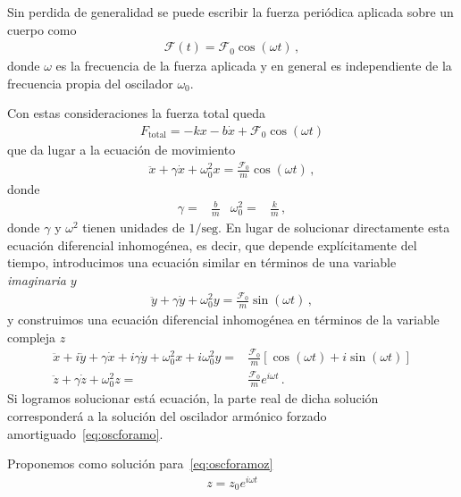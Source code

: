 Sin perdida de generalidad se puede escribir la fuerza periódica aplicada sobre un cuerpo como
\begin{align*}
  \mathcal{F}(t)=\mathcal{F}_0\cos(\omega t)\,,
\end{align*}
donde $\omega$ es la frecuencia de la fuerza aplicada y en general es independiente de la frecuencia propia del oscilador $\omega_0$. 

Con estas consideraciones la fuerza total queda
\begin{align*}
  F_{\text{total}}=-k x -b\dot x+\mathcal{F}_0\cos(\omega t)
\end{align*}
que da lugar a la ecuación de movimiento
\begin{align}
  \label{eq:oscforamo}
  \ddot x+\gamma \dot x+\omega_0^2 x=\frac{\mathcal{F}_0}{m}\cos(\omega t)\,,
\end{align}
donde
\begin{align*}
  \gamma=&\frac{b}{m}&\omega_0^2=&\frac{k}{m}\,,
\end{align*}
donde $\gamma$ y $\omega^2$ tienen unidades de $1/\text{seg}$. En lugar de solucionar directamente esta ecuación diferencial inhomogénea, es decir, que depende explícitamente del tiempo, introducimos una ecuación similar en términos de una variable \emph{imaginaria} $y$
\begin{align*}
    \ddot y+\gamma \dot y+\omega_0^2 y=\frac{\mathcal{F}_0}{m}\sin(\omega t)\,,
\end{align*}
y construimos una ecuación diferencial inhomogénea en términos de la variable compleja $z$
\begin{align}
  \label{eq:oscforamoz}
   \ddot x+i\ddot y+\gamma \dot x+i\gamma \dot y+\omega_0^2 x+i\omega_0^2 y=&
   \frac{\mathcal{F}_0}{m}\left[\cos(\omega t)+i\sin(\omega t)\right]\nonumber\\
    \ddot z+\gamma \dot z+\omega_0^2 z=&\frac{\mathcal{F}_0}{m}e^{i\omega t}\,.
\end{align}
Si logramos solucionar está ecuación, la parte real de dicha solución corresponderá a la solución del oscilador armónico forzado amortiguado~\eqref{eq:oscforamo}.

Proponemos como solución para~\eqref{eq:oscforamoz}
\begin{align}
  \label{eq:propsol}
  z=z_0 e^{i\omega t}
\end{align}


